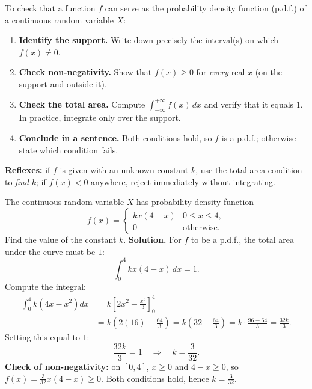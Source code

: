 \documentclass[11pt]{article}
\begin{document}
\begin{methode}
To check that a function $f$ can serve as the probability density function (p.d.f.) of a continuous random variable $X$:
\begin{enumerate}
\item \textbf{Identify the support.} Write down precisely the interval(s) on which $f(x)\neq 0$.
\item \textbf{Check non-negativity.} Show that $f(x)\geq 0$ for \emph{every} real $x$ (on the support and outside it).
\item \textbf{Check the total area.} Compute $\displaystyle\int_{-\infty}^{+\infty} f(x)\,dx$ and verify that it equals $1$. In practice, integrate only over the support.
\item \textbf{Conclude in a sentence.} Both conditions hold, so $f$ is a p.d.f.; otherwise state which condition fails.
\end{enumerate}
\textbf{Reflexes:} if $f$ is given with an unknown constant $k$, use the total-area condition to \emph{find} $k$; if $f(x)<0$ anywhere, reject immediately without integrating.
\end{methode}

\begin{exoresolu}
The continuous random variable $X$ has probability density function
\[ f(x)=\begin{cases} kx(4-x) & 0\leq x\leq 4,\\ 0 & \text{otherwise.}\end{cases} \]
Find the value of the constant $k$.
\tcblower
\textbf{Solution.} For $f$ to be a p.d.f., the total area under the curve must be $1$:
\[ \int_{0}^{4} kx(4-x)\,dx = 1. \]
Compute the integral:
\begin{align*}
\int_{0}^{4} k\left(4x-x^{2}\right)dx &= k\left[2x^{2}-\frac{x^{3}}{3}\right]_{0}^{4}\\
&= k\left(2(16)-\frac{64}{3}\right)=k\left(32-\frac{64}{3}\right)=k\cdot\frac{96-64}{3}=\frac{32k}{3}.
\end{align*}
Setting this equal to $1$:
\[ \frac{32k}{3}=1 \quad\Longrightarrow\quad k=\frac{3}{32}. \]
\textbf{Check of non-negativity:} on $[0,4]$, $x\geq 0$ and $4-x\geq 0$, so $f(x)=\tfrac{3}{32}x(4-x)\geq 0$. Both conditions hold, hence $\boxed{k=\tfrac{3}{32}}$.
\end{exoresolu}
\end{document}
